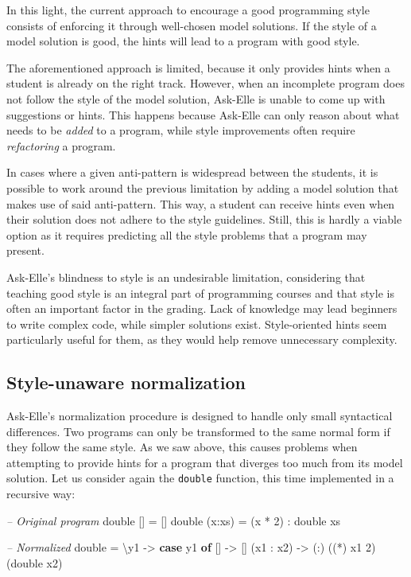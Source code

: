 \documentclass[a4paperpaper,]{report}
\newenvironment{Shaded}{}{}
\newcommand{\KeywordTok}[1]{\textcolor[rgb]{0.00,0.44,0.13}{\textbf{#1}}}
\newcommand{\DecValTok}[1]{\textcolor[rgb]{0.25,0.63,0.44}{#1}}
\newcommand{\CommentTok}[1]{\textcolor[rgb]{0.38,0.63,0.69}{\textit{#1}}}
\newcommand{\OtherTok}[1]{\textcolor[rgb]{0.00,0.44,0.13}{#1}}
\newcommand{\FunctionTok}[1]{\textcolor[rgb]{0.02,0.16,0.49}{#1}}
\newcommand{\NormalTok}[1]{#1}
\begin{document}
In this light, the current approach to encourage a good programming
style consists of enforcing it through well-chosen model solutions. If
the style of a model solution is good, the hints will lead to a program
with good style.

The aforementioned approach is limited, because it only provides hints
when a student is already on the right track. However, when an
incomplete program does not follow the style of the model solution,
Ask-Elle is unable to come up with suggestions or hints. This happens
because Ask-Elle can only reason about what needs to be \emph{added} to
a program, while style improvements often require \emph{refactoring} a
program.

In cases where a given anti-pattern is widespread between the students,
it is possible to work around the previous limitation by adding a model
solution that makes use of said anti-pattern. This way, a student can
receive hints even when their solution does not adhere to the style
guidelines. Still, this is hardly a viable option as it requires
predicting all the style problems that a program may present.

Ask-Elle's blindness to style is an undesirable limitation, considering
that teaching good style is an integral part of programming courses and
that style is often an important factor in the grading. Lack of
knowledge may lead beginners to write complex code, while simpler
solutions exist. Style-oriented hints seem particularly useful for them,
as they would help remove unnecessary complexity.

\hypertarget{style-unaware-normalization}{%
\subsection{Style-unaware
normalization}\label{style-unaware-normalization}}

Ask-Elle's normalization procedure is designed to handle only small
syntactical differences. Two programs can only be transformed to the
same normal form if they follow the same style. As we saw above, this
causes problems when attempting to provide hints for a program that
diverges too much from its model solution. Let us consider again the
\texttt{double} function, this time implemented in a recursive way:

\begin{Shaded}
\begin{Highlighting}[]
\CommentTok{-- Original program}
\NormalTok{double [] }\FunctionTok{=}\NormalTok{ []}
\NormalTok{double (x}\FunctionTok{:}\NormalTok{xs) }\FunctionTok{=}\NormalTok{ (x }\FunctionTok{*} \DecValTok{2}\NormalTok{) }\FunctionTok{:}\NormalTok{ double xs}

\CommentTok{-- Normalized}
\NormalTok{double }\FunctionTok{=}\NormalTok{ \textbackslash{}y1 }\OtherTok{->} \KeywordTok{case}\NormalTok{ y1 }\KeywordTok{of}
\NormalTok{    [] }\OtherTok{->}\NormalTok{ []}
\NormalTok{    (x1 }\FunctionTok{:}\NormalTok{ x2) }\OtherTok{->}\NormalTok{ (}\FunctionTok{:}\NormalTok{) ((}\FunctionTok{*}\NormalTok{) x1 }\DecValTok{2}\NormalTok{) (double x2)}
\end{Highlighting}
\end{Shaded}
\end{document}
